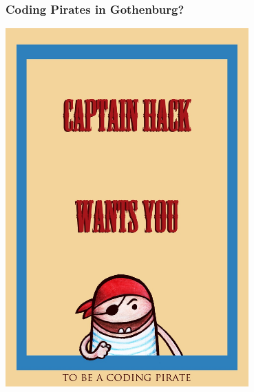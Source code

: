 \documentclass{beamer}
\begin{document}
\begin{frame}
  \frametitle{Coding Pirates in Gothenburg?}
  \begin{center}
    \includegraphics[origin=c,angle=-20,width=0.7\textwidth]{imagery/wanted}
  \end{center}

\end{frame}
\end{document}
